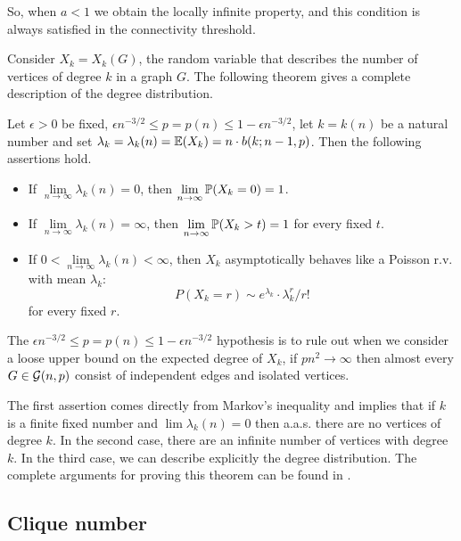 So, when $a<1$ we obtain the locally infinite property, and this condition is always satisfied in the connectivity threshold.

Consider $X_{k} = X_{k} (G)$, the random variable that describes the number of vertices of degree $k$ in a graph $G$. The following theorem gives a complete description of the degree distribution. 

\begin{theorem}\label{degreeTheorem}
Let $\epsilon>0$ be fixed, $\epsilon n^{-3/2} \leq p = p(n) \leq 1 - \epsilon n^{-3/2}$, let $k = k(n)$ be a natural number and set $\lambda_{k} = \lambda_{k}(n) = \E(X_{k}) = n\cdot b(k;n - 1,p)$. Then the following assertions hold.

\begin{itemize}
\item If $\lim\limits_{n\to \infty} \lambda_{k}(n) = 0$, then $\lim\limits_{n\to \infty} \P(X_{k} = 0) = 1$. 
\item If $\lim\limits_{n\to \infty} \lambda_{k}(n) = \infty$, then $\lim\limits_{n\to \infty} \P(X_{k} > t) = 1$
for every fixed $t$.
\item If $0 < \lim\limits_{n\to \infty} \lambda_{k}(n) < \infty$, then $X_{k}$ asymptotically behaves like a Poisson r.v. with mean $\lambda_{k}$: 
$$P(X_{k} = r) \sim e^{\lambda_{k}}\cdot \lambda_{k}^{r}/ r!$$
for every fixed $r$.
\end{itemize}
\end{theorem}

The $\epsilon n^{-3/2} \leq p = p(n) \leq 1 - \epsilon n^{-3/2}$ hypothesis is to rule out when we consider a loose upper bound on the expected degree of $X_ {k}$, if $pn^{2} \to \infty $ then almost every $ G \in \G (n, p) $ consist of independent edges and isolated vertices.

The first assertion comes directly from Markov's inequality and implies that if $k$ is a finite fixed number and $\lim \lambda_{k}(n) = 0$ then a.a.s. there are no vertices of degree $k$. In the second case, there are an infinite number of vertices with degree $k$. In the third case, we can describe explicitly the degree distribution. The complete arguments for proving this theorem can be found in \cite[Bollobás, p.~61]{Bollobas}.

\subsection{Clique number}

